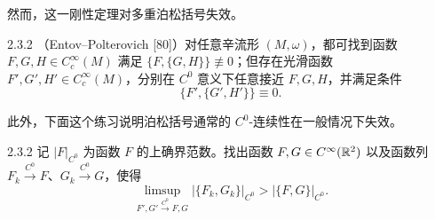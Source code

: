 然而，这一刚性定理对多重泊松括号失效。

\begin{wthm}{2.3.2}
（Entov--Polterovich [80]）对任意辛流形 $(M,\omega)$，都可找到函数
$F,G,H\in C_c^\infty(M)$ 满足 $\{F,\{G,H\}\}\not\equiv0$；但存在光滑函数
$F',G',H'\in C_c^\infty(M)$，分别在 $C^0$ 意义下任意接近 $F,G,H$，并满足条件
\[
  \{F',\{G',H'\}\}\equiv0 .
\]
\end{wthm}

此外，下面这个练习说明泊松括号通常的 $C^0$-连续性在一般情况下失效。

\begin{wexer}{2.3.2}
记 $|F|_{C^0}$ 为函数 $F$ 的上确界范数。找出函数 $F,G\in C^\infty(\mathbb{R}^2)$ 以及函数列
$F_k\xrightarrow{C^0}F$、$G_k\xrightarrow{C^0}G$，使得
\[
  \limsup_{F',G'\xrightarrow{C^0}F,G}|\{F_k,G_k\}|_{C^0}>|\{F,G\}|_{C^0}.
\]
\end{wexer}

